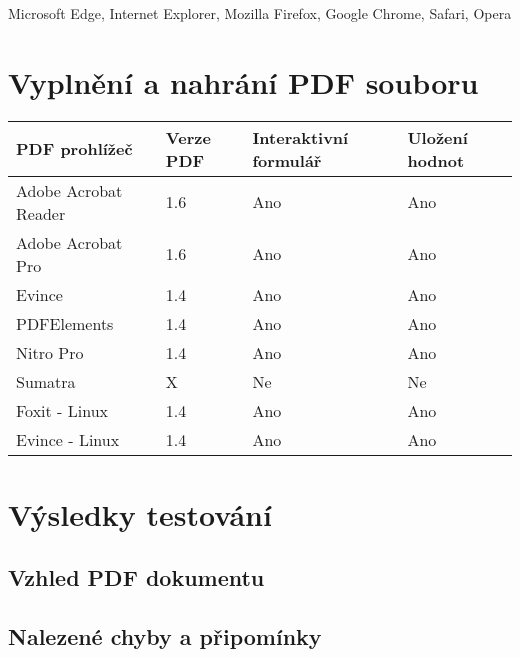 Microsoft Edge, Internet Explorer, Mozilla Firefox, Google Chrome, Safari, Opera

\section{Vyplnění a nahrání PDF souboru}

\begin{table}[h!]
\centering
\begin{tabular}{|l|l|l|l|} 
\hline
\textbf{PDF prohlížeč} & \textbf{Verze PDF} & \textbf{Interaktivní formulář} & \textbf{Uložení hodnot}  \\ 
\hline
Adobe Acrobat Reader   & 1.6                & Ano                            & Ano                      \\ 
\hline
Adobe Acrobat Pro      & 1.6                & Ano                            & Ano                      \\ 
\hline
Evince                 & 1.4                & Ano                            & Ano                      \\ 
\hline
PDFElements            & 1.4                & Ano                            & Ano                      \\ 
\hline
Nitro Pro              & 1.4                & Ano                            & Ano                      \\ 
\hline
Sumatra                & X                  & Ne                             & Ne                       \\ 
\hline
Foxit - Linux          & 1.4                & Ano                            & Ano                      \\ 
\hline
Evince - Linux         & 1.4                & Ano                            & Ano                      \\
\hline
\end{tabular}
\end{table}

\section{Výsledky testování}
\subsection{Vzhled PDF dokumentu}
\subsection{Nalezené chyby a připomínky}


 